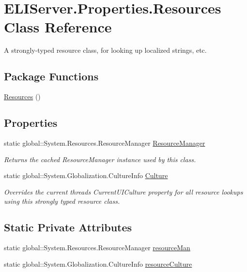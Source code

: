 \hypertarget{class_e_l_i_server_1_1_properties_1_1_resources}{}\section{E\+L\+I\+Server.\+Properties.\+Resources Class Reference}
\label{class_e_l_i_server_1_1_properties_1_1_resources}


A strongly-\/typed resource class, for looking up localized strings, etc.  


\subsection*{Package Functions}
\begin{DoxyCompactItemize}
\item 
\hyperlink{class_e_l_i_server_1_1_properties_1_1_resources_a5ba74b4a2d2cb2c51c1b299e654448c4}{Resources} ()
\end{DoxyCompactItemize}
\subsection*{Properties}
\begin{DoxyCompactItemize}
\item 
static global\+::\+System.\+Resources.\+Resource\+Manager \hyperlink{class_e_l_i_server_1_1_properties_1_1_resources_a705bf26c67f448de38b2cc6ed19ce1d9}{Resource\+Manager}
\begin{DoxyCompactList}\small\item\em Returns the cached Resource\+Manager instance used by this class. \end{DoxyCompactList}\item 
static global\+::\+System.\+Globalization.\+Culture\+Info \hyperlink{class_e_l_i_server_1_1_properties_1_1_resources_ad6d8391cb5afedbf226234c6bed3c11f}{Culture}
\begin{DoxyCompactList}\small\item\em Overrides the current thread\textquotesingle{}s Current\+U\+I\+Culture property for all resource lookups using this strongly typed resource class. \end{DoxyCompactList}\end{DoxyCompactItemize}
\subsection*{Static Private Attributes}
\begin{DoxyCompactItemize}
\item 
static global\+::\+System.\+Resources.\+Resource\+Manager \hyperlink{class_e_l_i_server_1_1_properties_1_1_resources_af14f5ae3346cb1cf53cda25f67cad6c8}{resource\+Man}
\item 
static global\+::\+System.\+Globalization.\+Culture\+Info \hyperlink{class_e_l_i_server_1_1_properties_1_1_resources_ad894e2cca56dae6ca74440c204a3725a}{resource\+Culture}
\end{DoxyCompactItemize}


